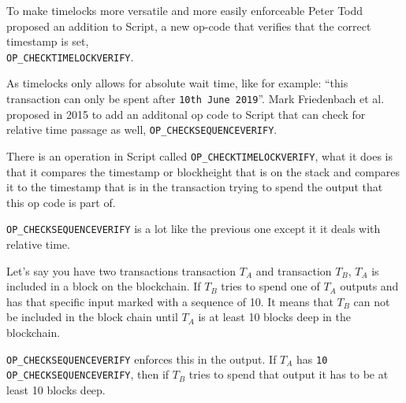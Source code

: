 To make timelocks more versatile and more easily enforceable Peter Todd proposed an addition to Script, a new op-code that verifies that the correct timestamp is set, \\\texttt{OP\_CHECKTIMELOCKVERIFY}.

As timelocks only allows for absolute wait time, like for example: \enquote{this transaction can only be spent after \texttt{10th June 2019}}. Mark Friedenbach et al. proposed in 2015 to add an additonal op code to Script that can check for relative time passage as well, \texttt{OP\_CHECKSEQUENCEVERIFY}.

There is an operation in Script called \texttt{OP\_CHECKTIMELOCKVERIFY}, what it does is that it compares the timestamp or blockheight that is on the stack and compares it to the timestamp that is in the transaction trying to spend the output that this op code is part of.\cite{antonopoulos_2017}\cite{checklocktime}\cite{script_wiki}\cite{bitcoin_core_tx}

\texttt{OP\_CHECKSEQUENCEVERIFY} is a lot like the previous one except it it deals with relative time. 

Let's say you have two transactions transaction $T_A$ and transaction $T_B$, $T_A$ is included in a block on the blockchain. If $T_B$ tries to spend one of $T_A$ outputs and has that specific input marked with a  sequence of 10. It means that $T_B$ can not be included in the block chain until $T_A$ is at least 10 blocks deep in the blockchain.\cite{antonopoulos_2017}\cite{checksequence}\cite{script_wiki}\cite{bitcoin_core_tx}

\texttt{OP\_CHECKSEQUENCEVERIFY} enforces this in the output. If $T_A$ has \texttt{10 OP\_CHECKSEQUENCEVERIFY}, then if $T_B$ tries to spend that output it has to be at least 10 blocks deep.
